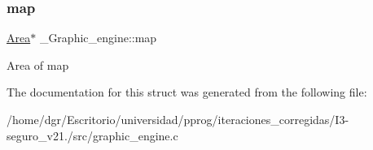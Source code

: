 \subsubsection{\texorpdfstring{map}{map}}
{\footnotesize\ttfamily \hyperlink{screen_8h_acfdfc42f6522d75fa3c16713afde8127}{Area}$\ast$ \+\_\+\+Graphic\+\_\+engine\+::map}

Area of map 

The documentation for this struct was generated from the following file\+:\begin{DoxyCompactItemize}
\item 
/home/dgr/\+Escritorio/universidad/pprog/iteraciones\+\_\+corregidas/\+I3-\/seguro\+\_\+v21./src/graphic\+\_\+engine.\+c\end{DoxyCompactItemize}
